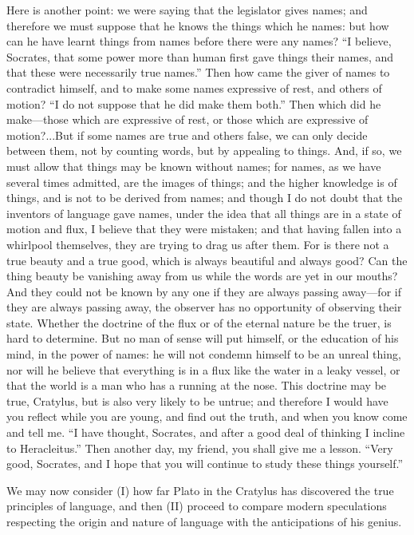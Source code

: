 \documentclass[11pt,letter]{article}
\begin{document}
\par  Here is another point: we were saying that the legislator gives names; and therefore we must suppose that he knows the things which he names: but how can he have learnt things from names before there were any names? “I believe, Socrates, that some power more than human first gave things their names, and that these were necessarily true names.” Then how came the giver of names to contradict himself, and to make some names expressive of rest, and others of motion? “I do not suppose that he did make them both.” Then which did he make—those which are expressive of rest, or those which are expressive of motion?...But if some names are true and others false, we can only decide between them, not by counting words, but by appealing to things. And, if so, we must allow that things may be known without names; for names, as we have several times admitted, are the images of things; and the higher knowledge is of things, and is not to be derived from names; and though I do not doubt that the inventors of language gave names, under the idea that all things are in a state of motion and flux, I believe that they were mistaken; and that having fallen into a whirlpool themselves, they are trying to drag us after them. For is there not a true beauty and a true good, which is always beautiful and always good? Can the thing beauty be vanishing away from us while the words are yet in our mouths? And they could not be known by any one if they are always passing away—for if they are always passing away, the observer has no opportunity of observing their state. Whether the doctrine of the flux or of the eternal nature be the truer, is hard to determine. But no man of sense will put himself, or the education of his mind, in the power of names: he will not condemn himself to be an unreal thing, nor will he believe that everything is in a flux like the water in a leaky vessel, or that the world is a man who has a running at the nose. This doctrine may be true, Cratylus, but is also very likely to be untrue; and therefore I would have you reflect while you are young, and find out the truth, and when you know come and tell me. “I have thought, Socrates, and after a good deal of thinking I incline to Heracleitus.” Then another day, my friend, you shall give me a lesson. “Very good, Socrates, and I hope that you will continue to study these things yourself.”

\par  We may now consider (I) how far Plato in the Cratylus has discovered the true principles of language, and then (II) proceed to compare modern speculations respecting the origin and nature of language with the anticipations of his genius.
\end{document}
